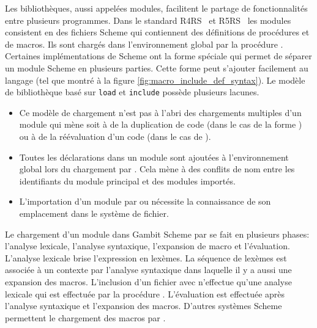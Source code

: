 Les bibliothèques, aussi appelées modules, facilitent le partage de
fonctionnalités entre plusieurs programmes. Dans le standard
R4RS~\cite{Scheme:R4RS} et R5RS~\cite{Scheme:R5RS} les modules consistent en des
fichiers Scheme qui contiennent des définitions de procédures et de macros. Ils
sont chargés dans l'environnement global par la procédure . Certaines
implémentations de Scheme ont la forme spéciale  qui permet de
séparer un module Scheme en plusieurs parties. Cette forme peut s'ajouter
facilement au langage (tel que montré à la figure
\ref{fig:macro_include_def_syntax}).  Le modèle de bibliothèque basé sur
\texttt{load} et \texttt{include} possède plusieurs lacunes.

\begin{itemize}
  \item Ce modèle de chargement n'est pas à l'abri des chargements multiples
    d'un module qui mène soit à de la duplication de code (dans le cas de la forme )
    ou à de la réévaluation d'un code (dans le cas de ).

  \item Toutes les déclarations dans un module sont ajoutées à l'environnement
    global lors du chargement par . Cela mène à des conflits de
    nom entre les identifiants du module principal et des modules importés.

  \item L'importation d'un module par  ou  nécessite la connaissance
    de son emplacement dans le système de fichier.

\end{itemize}


Le chargement d'un module dans Gambit Scheme par  se fait en plusieurs
phases: l'analyse lexicale, l'analyse syntaxique, l'expansion de macro et
l'évaluation. L'analyse lexicale brise l'expression en lexèmes. La séquence de
lexèmes est associée à un contexte par l'analyse syntaxique dans laquelle il y a aussi
une expansion des macros. L'inclusion d'un fichier avec  n'effectue qu'une
analyse lexicale qui est effectuée par la procédure . L'évaluation
est effectuée après l'analyse syntaxique et l'expansion des macros. D'autres systèmes
Scheme permettent le chargement des macros par .

